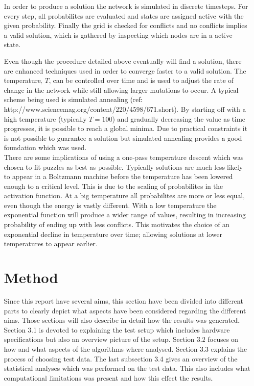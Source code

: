 \documentclass[a4paper,11pt]{kth-mag}
\begin{document}
In order to produce a solution the network is simulated in discrete timesteps.
For every step, all probabilites are evaluated and states are assigned active with the given probability.
Finally the grid is checked for conflicts and no conflicts implies a valid solution, which is gathered by inspecting which nodes are in a active state.

Even though the procedure detailed above eventually will find a solution, there are enhanced techniques used in order to converge faster to a valid solution.
The temperature, $T$, can be controlled over time and is used to adjust the rate of change in the network while still allowing larger mutations to occur.
A typical scheme being used is simulated annealing (ref: http://www.sciencemag.org/content/220/4598/671.short).
By starting off with a high temperature (typically $T = 100$) and gradually decreasing the value as time progresses, it is possible to reach a global minima.
Due to practical constraints it is not possible to guarantee a solution but simulated annealing provides a good foundation which was used.\\

There are some implications of using a one-pass temperature descent which was chosen to fit puzzles as best as possible.
Typically solutions are much less likely to appear in a Boltzmann machine before the temperature has been lowered enough to a critical level.
This is due to the scaling of probabilites in the activation function.
At a big temperature all probabilites are more or less equal, even though the energy is vastly different.
With a low temperature the exponential function will produce a wider range of values, resulting in increasing probability of ending up with less conflicts.
This motivates the choice of an exponential decline in temperature over time; allowing solutions at lower temperatures to appear earlier.

\chapter{Method}
Since this report have several aims, this section have been divided into different parts to clearly depict what aspects have been considered regarding the different aims. 
Those sections will also describe in detail how the results was generated. 
Section 3.1 is devoted to explaining the test setup which includes hardware specifications but also an overview picture of the setup. 
Section 3.2 focuses on how and what aspects of the algorithms where analysed.
Section 3.3 explains the process of choosing test data.
The last subsection 3.4 gives an overview of the statistical analyses which was performed on the test data.
This also includes what computational limitations was present and how this effect the results. 
\end{document}
